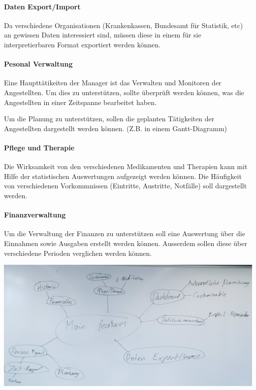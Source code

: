 \documentclass[a4paper]{scrreprt}
\begin{document}
\paragraph{Daten Export/Import}
Da verschiedene Organisationen (Krankenkassen, Bundesamt für Statistik, etc) an gewissen Daten interessiert sind, müssen diese in einem für sie interpretierbaren Format exportiert werden können. 

\paragraph{Pesonal Verwaltung}
Eine Haupttätikeiten der Manager ist das Verwalten und Monitoren der Angestellten. Um dies zu unterstützen, sollte überprüft werden können, was die Angestellten in einer Zeitspanne bearbeitet haben. 

Um die Planung zu unterstützen, sollen die geplanten Tätigkeiten der Angestellten dargestellt werden können. (Z.B. in einem Gantt-Diagramm)

\paragraph{Pflege und Therapie}
Die Wirksamkeit von den verschiedenen Medikamenten und Therapien kann mit Hilfe der statistischen Auswertungen aufgezeigt werden können. Die Häufigkeit von verschiedenen Vorkommnissen (Eintritte, Austritte, Notfälle) soll dargestellt werden. 

\paragraph{Finanzverwaltung}
Um die Verwaltung der Finanzen zu unterstützen soll eine Auswertung über die Einnahmen sowie Ausgaben erstellt werden können. Ausserdem sollen diese über verschiedene Perioden verglichen werden können.

\bigskip

\includegraphics[width=1\textwidth]{img/cropped_mindmap-mainfeatures}
\end{document}
